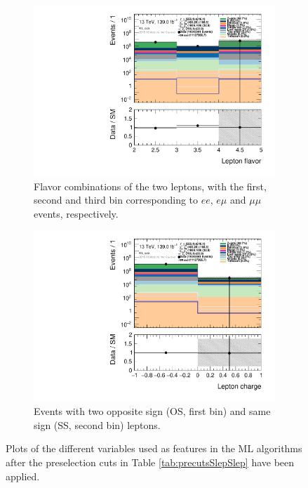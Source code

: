 \begin{figure}[H]\ContinuedFloat
\centering
    \begin{subfigure}[t!]{0.49\textwidth}
        \includegraphics[width=\textwidth]{Figures/ML_cuts/hist1d_lepFlavor[0]+lepFlavor[1]_ML_cuts.pdf}
    \caption{Flavor combinations of the two leptons, with the first, second and third bin corresponding to $ee$, $e\mu$ and $\mu\mu$ events, respectively.}
    \label{fig:my_label}
    \end{subfigure}
    \begin{subfigure}[t!]{0.49\textwidth}
        \includegraphics[width=\textwidth]{Figures/ML_cuts/hist1d_lepCharge[0]lepCharge[1]_ML_cuts.pdf}
    \caption{Events with two opposite sign (OS, first bin) and same sign (SS, second bin) leptons.}
    \label{fig:my_label}
    \end{subfigure}
    \caption{Plots of the different variables used as features in the ML algorithms after the preselection cuts in Table \ref{tab:precutsSlepSlep} have been applied.}
    \label{fig:ML_cuts}
\end{figure}


